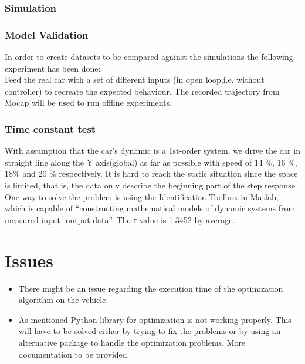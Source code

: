 \documentclass[oneside,12pt]{article}
\begin{document}
    \subsubsection{Simulation}
      

		\subsubsection{Model Validation}

		In order to create datasets to be compared against the simulations the
    following experiment has been done:\\
	  Feed the real car with a set of different inputs (in open loop,i.e. without
    controller) to recreate the expected behaviour. The recorded trajectory
    from Mocap will be used to run offline experiments.



		 \subsubsection{Time constant test}

		 With assumption that the car’s dynamic is a 1st-order system, we drive the
     car in straight line along the Y axis(global) as far as possible with speed of
     14 \%, 16 \%, 18\% and 20 \% respectively.
     It is hard to reach the static situation since the space is limited, that is, the
     data only describe the beginning part of the step response. One way to solve
     the problem is using the Identification Toolbox in Matlab, which is capable of
     “constructing mathematical models of dynamic systems from measured input-
     output data”.
     The τ value is 1.3452 by average.

\section{Issues}

\begin{itemize}
  \item There might be an issue regarding the execution time of the optimization
    algorithm on the vehicle.
  \item As mentioned Python library for optimization is not working properly.
    This will have to be solved either by trying to fix the problems or by
    using an alternative package to handle the optimization problems. More
    documentation to be provided.
\end{itemize}
\end{document}
